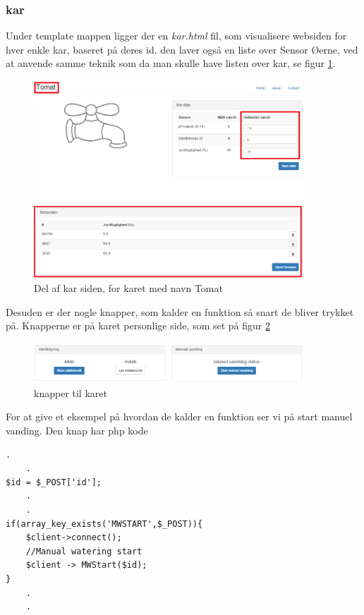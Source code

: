\subsubsection{kar}
Under template mappen ligger der en \textit{kar.html} fil, som visualisere websiden for hver enkle kar, baseret på deres id. den laver også en liste over Sensor Øerne, ved at anvende samme teknik som da man skulle have listen over kar, se figur \ref{fig:so}.  

\begin{figure}[H]
    \centering
    \includegraphics[width=0.9\textwidth]{SoftwareArkitektur/GUI/Controller/photo/so.PNG}
    \caption{Del af kar siden, for karet med navn Tomat}
    \label{fig:so}
\end{figure}

Desuden er der nogle knapper, som kalder en funktion så snart de bliver trykket på. Knapperne er på karet personlige side, som set på figur \ref{fig:knap}
\begin{figure}[H]
    \centering
    \includegraphics[width=0.9\textwidth]{SoftwareArkitektur/GUI/Controller/photo/knap.PNG}
    \caption{knapper til karet}
    \label{fig:knap}
\end{figure}

For at give et eksempel på hvordan de kalder en funktion ser vi på start manuel vanding. Den knap har php kode

\begin{lstlisting}[caption=index.php]
	.
	.
$id = $_POST['id'];
	.
	.
if(array_key_exists('MWSTART',$_POST)){
    $client->connect();
	//Manual watering start
	$client -> MWStart($id);
} 
	.
	.
\end{lstlisting}

